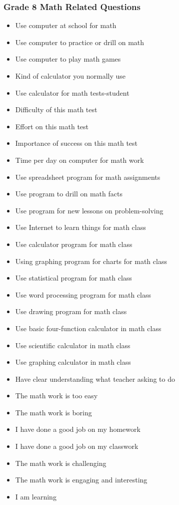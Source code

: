 \documentclass[letterpaper,12pt]{article}
\begin{document}
\begin{singlespace}
\subsubsection{Grade 8 Math Related Questions}
\begin{itemize}
	\item Use computer at school for math
	\item Use computer to practice or drill on math
	\item Use computer to play math games
	\item Kind of calculator you normally use
	\item Use calculator for math tests-student
	\item Difficulty of this math test
	\item Effort on this math test
	\item Importance of success on this math test
	\item Time per day on computer for math work
	\item Use spreadsheet program for math assignments
	\item Use program to drill on math facts
	\item Use program for new lessons on problem-solving
	\item Use Internet to learn things for math class
	\item Use calculator program for math class
	\item Using graphing program for charts for math class
	\item Use statistical program for math class
	\item Use word processing program for math class
	\item Use drawing program for math class
	\item Use basic four-function calculator in math class
	\item Use scientific calculator in math class
	\item Use graphing calculator in math class
	\item Have clear understanding what teacher asking to do
	\item The math work is too easy
	\item The math work is boring
	\item I have done a good job on my homework
	\item I have done a good job on my classwork
	\item The math work is challenging
	\item The math work is engaging and interesting
	\item I am learning
\end{itemize}


\end{singlespace}
\end{document}
